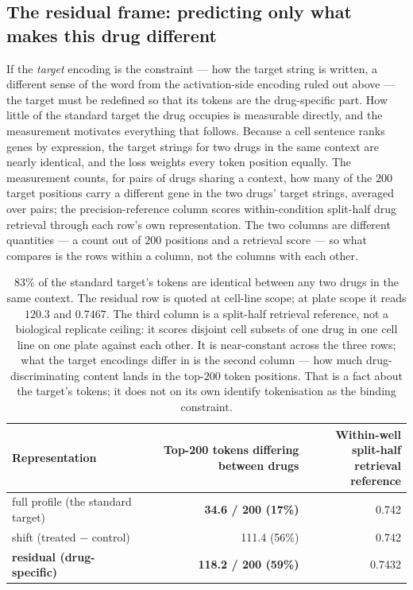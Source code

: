 \subsection{The residual frame: predicting only what makes this drug different}
\label{sec:methods-residual}

If the \emph{target} encoding is the constraint --- how the target string is written, a different
sense of the word from the activation-side encoding ruled out above --- the target must be redefined
so that its tokens are the drug-specific part. How little of the standard target the drug occupies is measurable directly, and
the measurement motivates everything that follows. Because a cell sentence ranks genes by
expression, the target strings for two drugs in the same context are nearly identical, and the loss
weights every token position equally. The measurement counts, for pairs of drugs sharing a context,
how many of the $200$ target positions carry a different gene in the two drugs' target strings,
averaged over pairs; the precision-reference column scores within-condition split-half drug retrieval
through each row's own representation. The two columns are different quantities --- a count out of
$200$ positions and a retrieval score --- so what compares is the rows within a column, not the
columns with each other.

\begin{table}[H]
\centering
\footnotesize
\begin{tabular}{lrr}
\toprule
Representation & Top-200 tokens differing between drugs & \shortstack[r]{Within-well split-half\\retrieval reference} \\
\midrule
full profile (the standard target) & \textbf{34.6 / 200 (17\%)} & 0.742 \\
shift (treated $-$ control) & 111.4 (56\%) & 0.742 \\
\textbf{residual (drug-specific)} & \textbf{118.2 / 200 (59\%)} & 0.7432 \\
\bottomrule
\end{tabular}
\caption{$83\%$ of the standard target's tokens are identical between any two drugs in the same
context. The residual row is quoted at cell-line scope; at plate scope it reads $120.3$ and
$0.7467$. The third column is a split-half retrieval reference, not a biological replicate ceiling:
it scores disjoint cell subsets of one drug in one cell line on one plate against each other. It is
near-constant across the three rows; what the target encodings differ in is the second column ---
how much drug-discriminating content lands in the top-$200$ token positions. That is a fact about the
target's tokens; it does not on its own identify tokenisation as the binding constraint.}
\label{tab:divergence}
\end{table}


